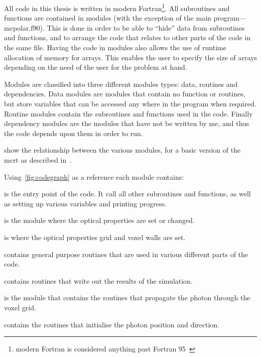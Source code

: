 All code in this thesis is written in modern Fortran\footnote{modern Fortran is considered anything past Fortran 95~\cite{metcalf2011modern}}.
All subroutines and functions are contained in modules (with the exception of the main program---mcpolar.f90).
This is done in order to be able to ``hide'' data from subroutines and functions, and to arrange the code that relates to other parts of the code in the same file.
Having the code in modules also allows the use of runtime allocation of memory for arrays.
This enables the user to specify the size of arrays depending on the need of the user for the problem at hand.

Modules are classified into three different modules types: data, routines and dependencies.
Data modules are modules that contain no function or routines, but store variables that can be accessed any where in the program when required.
Routine modules contain the subroutines and functions used in the code.
Finally dependency modules are the modules that have not be written by me, and thus the code depends upon them in order to run.

 show the relationship between the various modules, for a basic version of the \gls*{mcrt} as described in~.

\medskip
\indent Using~\cref{fig:codegraph} as a reference each module contains:

 is the entry point of the code. It call all other subroutines and functions, as well as setting up various variables and printing progress.

 is the module where the optical properties are set or changed.

 is where the optical properties grid and voxel walls are set.

 contains general purpose routines that are used in various different parts of the code.

 contains routines that write out the results of the simulation.

 is the module that contains the routines that propagate the photon through the voxel grid.

 contains the routines that initialise the photon position and direction.

